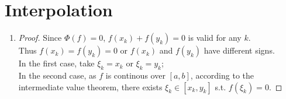 \documentclass[paper=a4, fontsize=11pt]{scrartcl} %
\numberwithin{equation}{section} %
\numberwithin{figure}{section} %
\numberwithin{table}{section} %
\begin{document}
\section{Interpolation}
\begin{enumerate}
	\item 
		\begin{proof}
			Since $\Phi(f)=0$, $f(x_k) + f(y_k) = 0$ is valid for any $k$.\\
			Thus $f(x_k) = f(y_k) = 0$ or $f(x_k)$ and $f(y_k)$ have different signs.\\
			In the first case, take $\xi_k = x_k$ or $\xi_k = y_k$;\\
			In the second case, as $f$ is continous over $[a, b]$, according to the  intermediate value theorem, there exists $\xi_k \in [x_k, y_k]$ s.t. $f(\xi_k) = 0$.
		\end{proof}
	

\end{enumerate}
\end{document}

